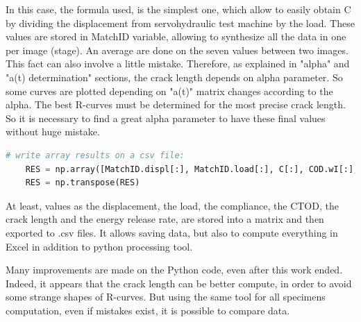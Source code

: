 In this case, the formula used, is the simplest one, which allow to easily obtain C by dividing the displacement from servohydraulic test machine by the load. These values are stored in MatchID variable, allowing to synthesize all the data in one per image (stage). An average are done on the seven values between two images. This fact can also involve a little mistake.
Therefore, as explained in "alpha" and "a(t) determination" sections, the crack length depends on alpha parameter. So some curves are plotted depending on "a(t)" matrix changes according to the alpha. The best R-curves must be determined for the most precise crack length. So it is necessary to find a great alpha parameter to have these final values without huge mistake.

\begin{lstlisting}[language=Python]
	# write array results on a csv file:
	RES = np.array([MatchID.displ[:], MatchID.load[:], C[:], COD.wI[:], a_t[:], G[:]])
	RES = np.transpose(RES)
\end{lstlisting}

At least, values as the displacement, the load, the compliance, the CTOD, the crack length and the energy release rate, are stored into a matrix and then exported to .csv files. It allows saving data, but also to compute everything in Excel in addition to python processing tool.

Many improvements are made on the Python code, even after this work ended. Indeed, it appears that the crack length can be better compute, in order to avoid some strange shapes of R-curves. But using the same tool for all specimens computation, even if mistakes exist, it is possible to compare data.


